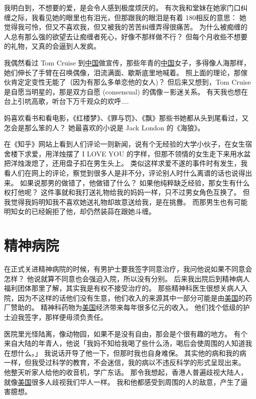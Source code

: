 \documentclass[12pt]{report}
\begin{document}
我明白到，不想要的爱，是会令人感到极度烦厌的。 有次我和堂妹在她家门口纠缠之际，我看见她的眼里也有泪光，但那跟我的眼泪是有着 180\textdegree 相反的意思： 她觉得我可怜，但又不喜欢我，但又被我的苦苦纠缠弄得很痛苦。 为什么被痴缠的人总有那么强的欲望去让痴缠者死心，好像不那样做不行？ 但每个月收些不想要的礼物，又真的会逼到人发疯。

我偶然看过 Tom Cruise 到\underline{中国}做宣传，那些年青的\underline{中国}女子，多得像人海那样，她们伸长了手臂在召唤偶像，泪流满面、歇斯底里地喊着。 照上面的理论，那傢伙肯定定变性无能了（因为有那么多单恋他的女人)？ 但后来又想到，Tom Cruise 是自愿当明星的，那是双方自愿 (consensual) 的偶像－影迷关系。 有天我也想在台上引吭高歌，听台下万千观众的欢呼....

妈喜欢看书和看电影，《红楼梦》、《罪与罚》、《飘》那些书她都从头到尾看过，又怎会是那么笨的人？ 她最喜欢的小说是 Jack London 的《海狼》。

在《知乎》网站上看到人们评论一则新闻，说有个无经验的大学小伙子，在女生宿舍楼下求爱，用洋烛摆了 I LOVE YOU 的字样，但那不领情的女生走下来用水盆把洋烛泼熄了，还用盘子扣在男生头上。  类似这样求爱不遂的事件时有发生，我看人们在网上的评论，察觉到很多人是非不分，评论别人时什么离谱的话也说得出来。 如果说那男的做错了，他做错了什么？  如果他纯粹缺乏经验，那女生有什么权打他呢？  这件事就和我打送礼物给我的妈妈一样，只不过男女角色互换了。  但我觉得我妈明知我不喜欢她送礼物却故意送给我，是在挑釁。  而那男生也有可能明知女的已经婉拒了他，却仍然装蒜在跟她斗缠。


\chapter{精神病院}

在正式关进精神病院的时候，有男护士要我签字同意治疗，我问他说如果不同意会怎样？ 他说就算不同意也会强迫入院，所以没有分别。 后来我出院后到精神病人福利团体那里了解，其实我是有权不接受治疗的。 那些精神科医生很想关病人入院，因为不这样的话他们没有生意，他们收入的来源其中一部分可能是由\underline{美国}的药厂赞助的。 精神科药物为\underline{美国}经济带来每年很多亿元的收入。 他们找个低级的护士迫我签字，那样便毋须负责任。

医院里光怪陆离，像动物园，如果不是没有自由，那会是个很有趣的地方。 有个来自大陆的年青人，他说「我妈不知给我喝了些什么汤，喝后会使周围的人知道我在想什么。」 我说话开导了他一下，但那时我也自身难保。 其实他的病和我的病一样，但我受过科学的教育，不会迷信，我的病以不违反科学的形式呈现出来。 他整天听家人给他的收音机，学广东话。 那令我想起，香港人普遍歧视大陆人，就像\underline{美国}很多人歧视我们华人一样。 我和他都感受到周围的人的敌意，产生了逼害臆想。
\end{document}
